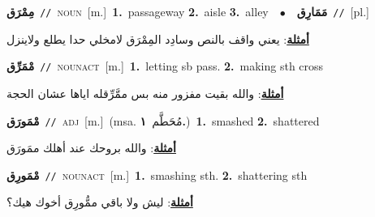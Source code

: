 \documentclass[10pt,a4paper,twoside]{article} %
\begin{document}
\begin{multicols}{2}
{\setlength\topsep{0pt}\textbf{\foreignlanguage{arabic}{مِمْرَق}}\ {\color{gray}\texttt{//}\color{black}}\ \textsc{noun}\ [m.]\ \textbf{1.}~passageway  \textbf{2.}~aisle  \textbf{3.}~alley\ \ $\bullet$\ \ \setlength\topsep{0pt}\textbf{\foreignlanguage{arabic}{مَمَارِق}}\ {\color{gray}\texttt{//}\color{black}}\ [pl.]\  \begin{flushright}\color{gray}\foreignlanguage{arabic}{\textbf{\underline{\foreignlanguage{arabic}{أمثلة}}}: يعني واقف بالنص وسادِد المِمْرَق لامخلي حدا يطلع ولاينزل}\end{flushright}\color{black}} \vspace{2mm}

{\setlength\topsep{0pt}\textbf{\foreignlanguage{arabic}{مْمَرِّق}}\ {\color{gray}\texttt{//}\color{black}}\ \textsc{noun\textunderscore act}\ [m.]\ \textbf{1.}~letting sb pass.  \textbf{2.}~making sth cross\  \begin{flushright}\color{gray}\foreignlanguage{arabic}{\textbf{\underline{\foreignlanguage{arabic}{أمثلة}}}: والله بقيت مفزور منه بس ممَّرِّقله اياها عشان الحجة}\end{flushright}\color{black}} \vspace{2mm}

{\setlength\topsep{0pt}\textbf{\foreignlanguage{arabic}{مْمَورَق}}\ {\color{gray}\texttt{//}\color{black}}\ \textsc{adj}\ [m.]\ \color{gray}(msa. \foreignlanguage{arabic}{مُحَطَّم}~\foreignlanguage{arabic}{\textbf{١.}})\color{black}\ \textbf{1.}~smashed  \textbf{2.}~shattered\  \begin{flushright}\color{gray}\foreignlanguage{arabic}{\textbf{\underline{\foreignlanguage{arabic}{أمثلة}}}: والله بروحك عند أهلك ممَورَق}\end{flushright}\color{black}} \vspace{2mm}

{\setlength\topsep{0pt}\textbf{\foreignlanguage{arabic}{مْمَورِق}}\ {\color{gray}\texttt{//}\color{black}}\ \textsc{noun\textunderscore act}\ [m.]\ \textbf{1.}~smashing sth.  \textbf{2.}~shattering sth\  \begin{flushright}\color{gray}\foreignlanguage{arabic}{\textbf{\underline{\foreignlanguage{arabic}{أمثلة}}}: ليش ولا باقي ممُّورِق أخوك هيك؟}\end{flushright}\color{black}} \vspace{2mm}


\end{multicols}
\end{document}
